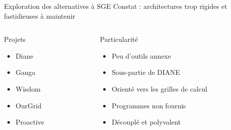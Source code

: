 \documentclass{beamer}
\begin{document}
\begin{frame}{Exploration des alternatives à SGE}
    Constat : architectures trop rigides et fastidieuses à maintenir
	\begin{columns}
	\begin{column}[l]{0.3\linewidth}
    \begin{block}{Projets}
        \begin{itemize}
            \item<2-> Diane
            \item<3-> Ganga
            \item<4-> Wisdom
            \item<5-> OurGrid
            \item<6-> Proactive
        \end{itemize}
    \end{block}
	\end{column}
	\begin{column}[r]{0.6\linewidth}
    \begin{exampleblock}{Particularité}
        \begin{itemize}
            \item<2-> Peu d'outils annexe
            \item<3-> Sous-partie de DIANE
            \item<4-> Orienté vers les grilles de calcul
            \item<5-> Programmes non fournis
            \item<6-> Découplé et polyvalent
        \end{itemize}
    \end{exampleblock}
	\end{column}
	\end{columns}
\end{frame}

\end{document}
